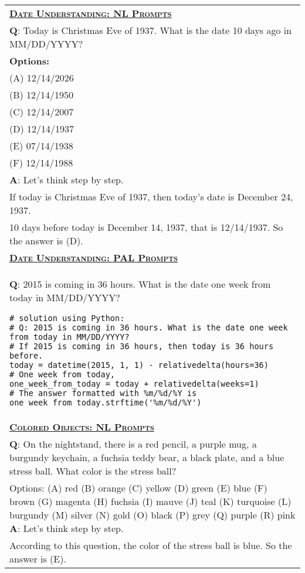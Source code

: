 \begin{table}[htbp]
    \centering
    \begin{tabular}{p{}}
        \toprule
        \underline{\textbf{\textsc{Date Understanding: NL Prompts}}} \\
\textbf{Q}: Today is Christmas Eve of 1937. What is the date 10 days ago in MM/DD/YYYY? \\
\textbf{Options:} \\
(A) 12/14/2026 \\
(B) 12/14/1950 \\
(C) 12/14/2007 \\
(D) 12/14/1937 \\
(E) 07/14/1938 \\
(F) 12/14/1988 \\
\textbf{A}: Let's think step by step. \\
If today is Christmas Eve of 1937, then today's date is December 24, 1937. \\
10 days before today is December 14, 1937, that is 12/14/1937. So the answer is (D). \\
        \midrule
        \underline{\textbf{\textsc{Date Understanding: PAL Prompts}}} \\
 \textbf{Q}: 2015 is coming in 36 hours. What is the date one week from today in MM/DD/YYYY?
\begin{verbatim}
# solution using Python:
# Q: 2015 is coming in 36 hours. What is the date one week from today in MM/DD/YYYY?
# If 2015 is coming in 36 hours, then today is 36 hours before.
today = datetime(2015, 1, 1) - relativedelta(hours=36)
# One week from today,
one_week_from_today = today + relativedelta(weeks=1)
# The answer formatted with %m/%d/%Y is
one_week_from_today.strftime('%m/%d/%Y')
\end{verbatim}
        \\
        \midrule
\underline{\textbf{\textsc{Colored Objects: NL Prompts}}} \\
\textbf{Q}: On the nightstand, there is a red pencil, a purple mug, a burgundy keychain, a fuchsia teddy bear, a black plate, and a blue stress ball. What color is the stress ball? \\
Options:
(A) red
(B) orange
(C) yellow
(D) green
(E) blue
(F) brown
(G) magenta
(H) fuchsia
(I) mauve
(J) teal
(K) turquoise
(L) burgundy
(M) silver
(N) gold
(O) black
(P) grey
(Q) purple
(R) pink
\textbf{A}: Let's think step by step. \\
According to this question, the color of the stress ball is blue. So the answer is (E). \\


\end{tabular}
\end{table}
